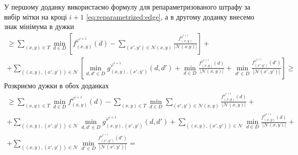 У першому доданку використаємо формулу для репараметризованого штрафу за вибір
мітки на кроці $i + 1$ \eqref{eq:reparametrized:edge},
а в другому доданку внесемо знак мінімума в дужки
\begin{equation*}
\begin{gathered}
    \ge \sum \limits_{\left(x, y \right) \in T}
        \min \limits_{d \in D} \left[
            f_{\left(x, y \right)}^{\varphi^{i + 1}} \left( d \right) -
            \sum \limits_{\left(x', y' \right) \in \mathcal{N}\left(x, y \right)}
                \frac{f_{\left(x, y \right)}^{\varphi^{i + 1}}}{\left| \mathcal{N}\left(x. y \right) \right|}
        \right] + \\
    + \sum \limits_{\left(\left(x, y \right), \left(x', y' \right)\right)\in \mathcal{N}}
    \left[
        \min\limits_{d, d' \in D}
            g_{\left(x, y \right),\left(x', y'\right)}^{\varphi^{i + 1}}
                \left(d, d' \right) +
        \min \limits_{d \in D}
            \frac{f_{\left(x, y \right)}^{\varphi^{i + 1}} \left( d \right)}{\left| \mathcal{N}\left(x, y\right)\right|} +
        \min \limits_{d' \in D}
            \frac{f_{\left(x', y' \right)}^{\varphi^{i + 1}} \left( d' \right)}{\left| \mathcal{N}\left(x', y'\right)\right|}
    \right] \ge
\end{gathered}
\end{equation*}
Розкриємо дужки в обох доданках
\begin{equation*}
\begin{gathered}
    \ge \sum \limits_{\left(x, y \right) \in T}
        \min \limits_{d \in D}
            f_{\left(x, y \right)}^{\varphi^{i + 1}}\left( d \right) -
    \sum \limits_{\left(x, y \right) \in T}
        \min \limits_{d \in D}
            \sum \limits_{\left(x', y' \right) \in \mathcal{N} \left(x, y \right)}
                \frac{f_{\left(x, y \right)}^{\varphi^{i + 1}} \left( d \right)}{\left| \mathcal{N}\left(x, y \right) \right|} + \\
    + \sum \limits_{\left(\left(x, y \right), \left(x', y' \right) \right)\in\mathcal{N}}
        \min \limits_{d, d' \in D}
            g_{\left(x, y \right), \left(x', y' \right)}^{\varphi^{i + 1}}
                \left(d, d' \right) +
    \sum \limits_{\left(\left(x, y \right), \left(x', y' \right) \right)\in\mathcal{N}}
        \min \limits_{d \in D}
            \frac{f_{\left(x, y \right)}^{\varphi^{i + 1}} \left( d \right)}{\left| \mathcal{N}\left(x, y\right)\right|} + \\
    + \sum \limits_{\left(\left(x, y \right), \left(x', y' \right) \right)\in\mathcal{N}}
    \min \limits_{d' \in D}
        \frac{f_{\left(x', y' \right)}^{\varphi^{i + 1}} \left( d' \right)}{\left| \mathcal{N}\left(x', y'\right)\right|} =
\end{gathered}
\end{equation*}
